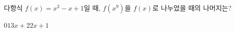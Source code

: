 다항식 $f(x)=x^2-x+1$일 때, $f(x^9)$을 $f(x)$로 나누었을 때의 나머지는?
\begin{choices32}{$0$}{$1$}{$3$}{$x+2$}{$2x+1$}\end{choices32}
